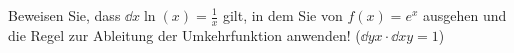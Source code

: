 \item Beweisen Sie, dass $\dd{}{x}\ln(x) = \frac{1}{x}$ gilt, in dem Sie von $f(x) = e^x$ ausgehen und die Regel zur Ableitung der Umkehrfunktion anwenden! ($\dd{y}{x}\cdot\dd{x}{y}=1$)